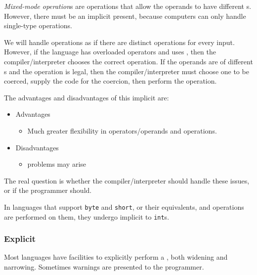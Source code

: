 \begin{definition}\label{def:Mixed_Mode_Operation}
  \emph{Mixed-mode operation}s are operations that allow the operands to have different s.
  However, there must be an implicit  present, because computers can only handle single-type operations.

  \begin{remark}\label{rmk:Relation_to_Overloaded_Operations}
    We will handle operations as if there are distinct operations for every  input.
    However, if the language has overloaded operators and uses , then the compiler/interpreter chooses the correct operation.
    If the operands are of different s and the operation is legal, then the compiler/interpreter must choose one to be coerced, supply the code for the coercion, then perform the operation.
  \end{remark}

  The advantages and disadvantages of this implicit  are:
  \begin{itemize}[noitemsep]
  \item Advantages
    \begin{itemize}[noitemsep]
    \item Much greater flexibility in operators/operands and operations.
    \end{itemize}
  \item Disadvantages
    \begin{itemize}[noitemsep]
    \item {} problems may arise
    \end{itemize}
  \end{itemize}
  The real question is whether the compiler/interpreter should handle these issues, or if the programmer should.
\end{definition}

In languages that support \texttt{byte} and \texttt{short}, or their equivalents, and operations are performed on them, they undergo implicit  to \texttt{int}s.

\subsubsection{Explicit }\label{subsubsec:Explicit_Type_Conversion}
Most languages have facilities to explicitly perform a , both widening and narrowing.
Sometimes warnings are presented to the programmer.

